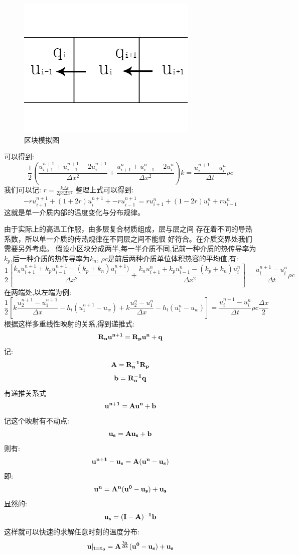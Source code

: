 \documentclass{cumcmthesis}
\begin{document}
    \begin{figure}[h] 
        \centering 
        \includegraphics[scale=0.9]{../figure/diff.png} 
        \caption{区块模拟图}\label{diff}    
    \end{figure}
    可以得到:
    \[
        \frac{1}{2}
        \left(
            \frac{u_{i+1}^{n+1} + u_{i-1}^{n+1} - 2u_{i}^{n+1} }{\Delta x^2}
            +
            \frac{u_{i+1}^{n} + u_{i-1}^{n} - 2u_{i}^{n} }{\Delta x^2}
        \right)
        k
        =
        \frac{ u_{i}^{n+1} - u_{i}^{n} }{\Delta t} \rho c
    \]
    我们可以记:
    \( r = \frac{k \Delta t}{ 2 \rho c \Delta x^2 } \)
    整理上式可以得到:
    \[
        -ru_{i+1}^{n+1} + (1+2r)u_{i}^{n+1} + -ru_{i-1}^{n+1}
        =
        ru_{i+1}^{n} + (1-2r)u_{i}^{n} + ru_{i-1}^{n}
    \]
    这就是单一介质内部的温度变化与分布规律。

    由于实际上的高温工作服，由多层复合材质组成，层与层之间
    存在着不同的导热系数，所以单一介质的传热规律在不同层之间不能很
    好符合。在介质交界处我们需要另外考虑。
    假设小区块分成两半,每一半介质不同,记前一种介质的热传导率为\(k_p\),后一种介质的热传导率为\(k_n\),
    \(\rho c\)是前后两种介质单位体积热容的平均值,有:
    \[
        \frac{1}{2}
        \left[
            \frac{k_n u_{i+1}^{n+1} + k_p u_{i-1}^{n+1} - (k_p+k_n)u_{i}^{n+1}) }{\Delta x^2}
            +
            \frac{k_n u_{i+1}^{n} + k_p u_{i-1}^{n} - (k_p+k_n)u_{i}^{n} }{\Delta x^2}
        \right]
        =
        \frac{ u_{i}^{n+1} - u_{i}^{n} }{\Delta t} \rho c
    \]
    在两端处,以左端为例:
    \[
        \frac{1}{2}
        \left[
            k\frac{ u_{2}^{n+1}  - u_{1}^{n+1} }{\Delta x}
            -
            h_l(u_{1}^{n+1} - u_w)
            +
            k\frac{ u_{2}^{n}  - u_{1}^{n} }{\Delta x}
            -
            h_l(u_{1}^{n} - u_w)
        \right]
        =
        \frac{ u_{i}^{n+1} - u_{i}^{n} }{\Delta t} \rho c \frac{\Delta x}{2}
    \]
    根据这样多重线性映射的关系,得到递推式:
    \[\bf{R_n}\bf{u}^{n+1} = \bf{R_p}\bf{u}^{n} + \bf{q}\]
    记:
    \[\bf{A} = \bf{R}_n^{-1}\bf{R}_p\]
    \[\bf{b} = \bf{R}_n^{-1}\bf{q}\]
    有递推关系式
    \[\bf{u}^{n+1} = \bf{A}\bf{u}^{n} + \bf{b}\]
    记这个映射有不动点:
    \[\bf{u}_s = \bf{A}\bf{u}_s + \bf{b}\]
    则有:
    \[ \bf{u}^{n+1} - \bf{u}_s = \bf{A} (\bf{u}^n - \bf{u}_s) \]
    即:
    \[\bf{u}^{n} = \bf{A}^n (\bf{u}^0 - \bf{u}_s) + \bf{u}_s\]
    显然的:
    \[\bf{u}_s = (\bf{I} - \bf{A})^{-1}\bf{b}\]
    这样就可以快速的求解任意时刻的温度分布:
    \[\bf{u}|_{t = t_0} = \bf{A}^{\frac{t_0}{\Delta t}} (\bf{u}^0 - \bf{u}_s) + \bf{u}_s\]
\end{document}
